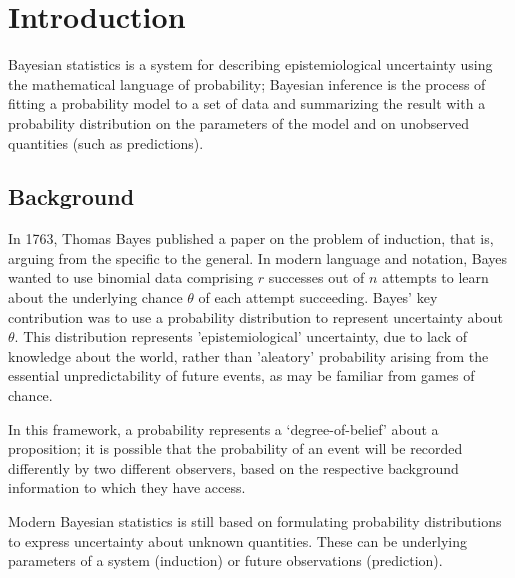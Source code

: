 \section{Introduction}
Bayesian statistics is a system for describing epistemiological uncertainty using the mathematical language of probability; Bayesian inference is the process of fitting a probability model to a set of data and summarizing the result with a probability distribution on the parameters of the model and on
unobserved quantities (such as predictions).
\subsection{Background } %
In 1763, Thomas Bayes published a paper on the problem of induction, that is, arguing from the specific to the general. In modern language and notation, Bayes wanted to use binomial data comprising $r$ successes out of $n$ attempts to learn about the underlying chance $\theta$ of each attempt succeeding. Bayes' key contribution was to use a probability distribution to represent uncertainty about $\theta$. This distribution represents 'epistemiological' uncertainty, due to lack of knowledge about the world, rather than 'aleatory' probability arising from the essential unpredictability of future events, as may be familiar from games of chance. \par In this framework, a probability represents a `degree-of-belief' about a proposition; it is possible that the probability of an event will be recorded differently by two different observers, based on the respective background information to which they have access. 

\newpage\noindent Modern Bayesian statistics is still based on formulating probability distributions to express uncertainty about unknown quantities. These can be underlying parameters of a system (induction) or future observations (prediction).
